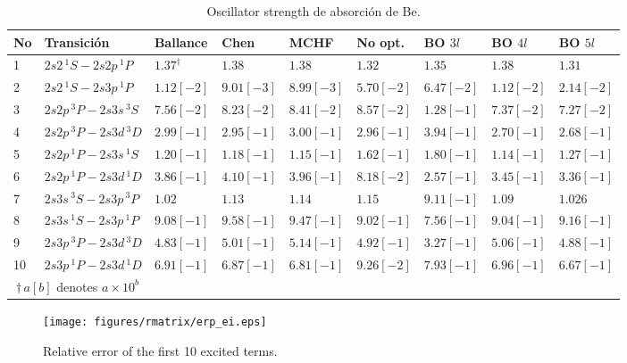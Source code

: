 \begin{table}
\begin{adjustwidth}{-.6in}{-.6in}  
\centering
\begin{tabular}{|lllllllll|} 
\hline 
No & Transición               & Ballance   & Chen       & MCHF       & No opt.    & BO $3l$    & BO $4l$  & BO $5l$ \\
\hline
\hline
1 & $2s2  \,^1S - 2s2p \,^1P$ & $1.37^\dagger$ & $1.38$ & $1.38    $ & $1.32    $ & $1.35    $ & $1.38    $ & $1.31$ \\
2 & $2s2  \,^1S - 2s3p \,^1P$ & $1.12[-2]$ & $9.01[-3]$ & $8.99[-3]$ & $5.70[-2]$ & $6.47[-2]$ & $1.12[-2]$ & $2.14[-2]$ \\
3 & $2s2p \,^3P - 2s3s \,^3S$ & $7.56[-2]$ & $8.23[-2]$ & $8.41[-2]$ & $8.57[-2]$ & $1.28[-1]$ & $7.37[-2]$ & $7.27[-2]$ \\
4 & $2s2p \,^3P - 2s3d \,^3D$ & $2.99[-1]$ & $2.95[-1]$ & $3.00[-1]$ & $2.96[-1]$ & $3.94[-1]$ & $2.70[-1]$ & $2.68[-1]$ \\
5 & $2s2p \,^1P - 2s3s \,^1S$ & $1.20[-1]$ & $1.18[-1]$ & $1.15[-1]$ & $1.62[-1]$ & $1.80[-1]$ & $1.14[-1]$ & $1.27[-1]$ \\
6 & $2s2p \,^1P - 2s3d \,^1D$ & $3.86[-1]$ & $4.10[-1]$ & $3.96[-1]$ & $8.18[-2]$ & $2.57[-1]$ & $3.45[-1]$ & $3.36[-1]$ \\
7 & $2s3s \,^3S - 2s3p \,^3P$ & $1.02$     & $1.13    $ & $1.14    $ & $1.15    $ & $9.11[-1]$ & $1.09    $ & $1.026$ \\
8 & $2s3s \,^1S - 2s3p \,^1P$ & $9.08[-1]$ & $9.58[-1]$ & $9.47[-1]$ & $9.02[-1]$ & $7.56[-1]$ & $9.04[-1]$ & $9.16[-1]$ \\
9 & $2s3p \,^3P - 2s3d \,^3D$ & $4.83[-1]$ & $5.01[-1]$ & $5.14[-1]$ & $4.92[-1]$ & $3.27[-1]$ & $5.06[-1]$ & $4.88[-1]$ \\
10 & $2s3p \,^1P - 2s3d \,^1D$ & $6.91[-1]$ & $6.87[-1]$ & $6.81[-1]$ & $9.26[-2]$ & $7.93[-1]$ & $6.96[-1]$ & $6.67[-1]$ \\
\hline
\multicolumn{2}{c}{$\dagger\,a[b]$ denotes $a\times 10^b$} \\
\end{tabular}
\caption{Oscillator strength de absorción de Be.}
\label{tab:fabs}
\end{adjustwidth}
\end{table}

\begin{figure}
\centering
\texttt{[image: figures/rmatrix/erp\_ei.eps]} 
\caption{Relative error of the first 10 excited terms.}
\label{fig:exener}
\end{figure}

